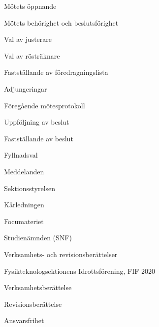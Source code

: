 \documentclass[slutlig]{sektionsmote}
\begin{document}
\maketitle

\begin{ootd}

\item{Mötets öppnande}

\item{Mötets behörighet och beslutsförighet}

\item{Val av justerare}

\item{Val av rösträknare}

\item{Fastställande av föredragningslista}

\item{Adjungeringar}

\item{Föregående mötesprotokoll}

\item{Uppföljning av beslut}

\item{Fastställande av beslut}
\begin{ootd}
    \item Fyllnadsval
\end{ootd}

\item{Meddelanden}
\begin{ootd}
    \item Sektionsstyrelsen
    \item Kårledningen
    \item Focumateriet
    \item Studienämnden (SNF)
\end{ootd}

\item{Verksamhets- och revisionsberättelser}
\begin{ootd}
    \item Fysikteknologsektionens Idrottsförening, FIF 2020
    \begin{ootd}
        \item Verksamhetsberättelse
        \item Revisionsberättelse
        \item Ansvarsfrihet
    \end{ootd}
\end{ootd}


\end{ootd}
\end{document}
